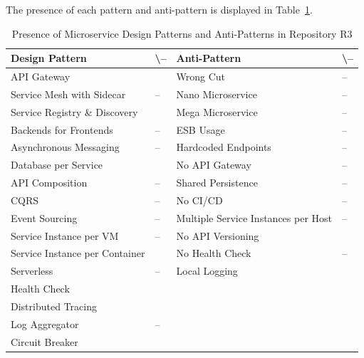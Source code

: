 \documentclass{Configuration_Files/PoliMi3i_thesis}
\newcommand{\cmark}{\ding{51}}%
\begin{document}
The presence of each pattern and anti-pattern is displayed in Table~\ref{table:R3_result}.

\begin{table}[H]
\centering 
    \begin{tabular}{ 
  | >{\centering\arraybackslash} m{16em} 
  | >{\centering\arraybackslash} m{2.2em} 
  | >{\centering\arraybackslash} m{16em} 
  | >{\centering\arraybackslash} m{2.2em} | }
    \hline
    \rowcolor{bluepoli!40}
    \textbf{Design Pattern} & \cmark \textbackslash – & \textbf{Anti-Pattern} & \cmark \textbackslash – \T\B \\
    \hline \hline
    API Gateway & \cmark & Wrong Cut & – \T\B\\
    \hline
    \rowcolor{bluepoli!10}
    Service Mesh with Sidecar & – & Nano Microservice & – \T\B \\
    \hline
    Service Registry \& Discovery & \cmark & Mega Microservice & – \T\B \\
    \hline
    \rowcolor{bluepoli!10}
    Backends for Frontends & – & ESB Usage & – \T\B \\
    \hline
    Asynchronous Messaging & – & Hardcoded Endpoints & – \T\B \\
    \hline
    \rowcolor{bluepoli!10}
    Database per Service & \cmark & No API Gateway & – \T\B \\
    \hline
    API Composition & – & Shared Persistence & – \T\B \\
    \hline
    \rowcolor{bluepoli!10}
    CQRS & – & No CI/CD & – \T\B \\
    \hline
    Event Sourcing & – & Multiple Service Instances per Host & – \T\B \\
    \hline
    \rowcolor{bluepoli!10}
    Service Instance per VM & – & No API Versioning & \cmark \T\B \\
    \hline
    Service Instance per Container & \cmark & No Health Check & – \T\B \\
    \hline
    \rowcolor{bluepoli!10}
    Serverless & – & Local Logging & \cmark \T\B \\
    \hline
    Health Check & \cmark &  & \T\B \\
    \hline
    \rowcolor{bluepoli!10}
    Distributed Tracing & \cmark & & \T\B \\
    \hline
    Log Aggregator & – &  & \T\B \\
    \hline
    \rowcolor{bluepoli!10}
    Circuit Breaker & \cmark &  & \T\B \\
    \hline
    \end{tabular}
    \\[10pt]
    \caption{Presence of Microservice Design Patterns and Anti-Patterns in Repository R3}
    \label{table:R3_result}
\end{table}
\end{document}

